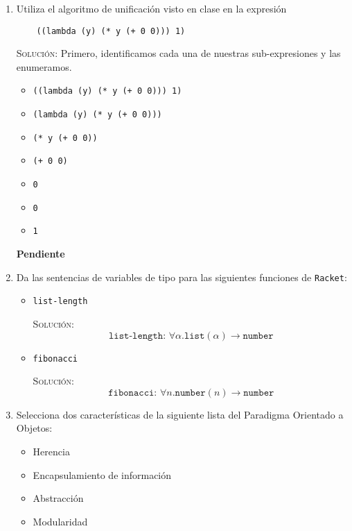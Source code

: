 \documentclass[letterpaper,11pt]{article}
\begin{document}
\begin{enumerate}
    \item Utiliza el algoritmo de unificación visto en clase en la expresión
    \begin{verbatim}
    ((lambda (y) (* y (+ 0 0))) 1)
    \end{verbatim}

    \textsc{Solución:} Primero, identificamos cada una de nuestras 
    sub-expresiones y las enumeramos.
    \begin{itemize}
        \item {} \texttt{((lambda (y) (* y (+ 0 0))) 1)}
        \item {} \texttt{(lambda (y) (* y (+ 0 0)))}
        \item {} \texttt{(* y (+ 0 0))}
        \item {} \texttt{(+ 0 0)}
        \item {} \texttt{0}
        \item {} \texttt{0}
        \item {} \texttt{1}
    \end{itemize}

    \textbf{Pendiente}


    \item Da las sentencias de variables de tipo para las siguientes funciones 
    de \texttt{Racket}:
    \begin{itemize}
        \item \texttt{list-length}

        \textsc{Solución:}
        \begin{equation*}
            \texttt{list-length: }\forall \alpha. \texttt{list}(\alpha) 
        \rightarrow \texttt{number}
        \end{equation*}

        \item \texttt{fibonacci}
        
        \textsc{Solución:} 
        \begin{equation*}
            \texttt{fibonacci: } \forall n. \texttt{number}(n) \rightarrow 
            \texttt{number}
        \end{equation*}
    \end{itemize}

    \item Selecciona dos características de la siguiente lista del Paradigma 
    Orientado a Objetos:
    \begin{itemize}
        \item Herencia
        \item Encapsulamiento de información
        \item Abstracción
        \item Modularidad
    \end{itemize}


\end{enumerate}
\end{document}
